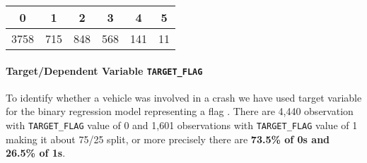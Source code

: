\documentclass[]{article}
\let\oldparagraph\paragraph
\renewcommand{\paragraph}[1]{\oldparagraph{#1}\mbox{}}
\begin{document}
\begin{longtable}[]{@{}cccccc@{}}
\toprule
\begin{minipage}[b]{0.08\columnwidth}\centering\strut
0\strut
\end{minipage} & \begin{minipage}[b]{0.07\columnwidth}\centering\strut
1\strut
\end{minipage} & \begin{minipage}[b]{0.07\columnwidth}\centering\strut
2\strut
\end{minipage} & \begin{minipage}[b]{0.07\columnwidth}\centering\strut
3\strut
\end{minipage} & \begin{minipage}[b]{0.07\columnwidth}\centering\strut
4\strut
\end{minipage} & \begin{minipage}[b]{0.07\columnwidth}\centering\strut
5\strut
\end{minipage}\tabularnewline
\midrule
\endhead
\begin{minipage}[t]{0.08\columnwidth}\centering\strut
3758\strut
\end{minipage} & \begin{minipage}[t]{0.07\columnwidth}\centering\strut
715\strut
\end{minipage} & \begin{minipage}[t]{0.07\columnwidth}\centering\strut
848\strut
\end{minipage} & \begin{minipage}[t]{0.07\columnwidth}\centering\strut
568\strut
\end{minipage} & \begin{minipage}[t]{0.07\columnwidth}\centering\strut
141\strut
\end{minipage} & \begin{minipage}[t]{0.07\columnwidth}\centering\strut
11\strut
\end{minipage}\tabularnewline
\bottomrule
\end{longtable}

\paragraph{\texorpdfstring{Target/Dependent Variable
\texttt{TARGET\_FLAG}}{Target/Dependent Variable TARGET\_FLAG}}\label{targetdependent-variable-target_flag}

To identify whether a vehicle was involved in a crash we have used
target variable for the binary regression model representing a flag .
There are 4,440 observation with \texttt{TARGET\_FLAG} value of 0 and
1,601 observations with \texttt{TARGET\_FLAG} value of 1 making it about
75/25 split, or more precisely there are \textbf{73.5\% of 0s and 26.5\%
of 1s}.
\end{document}
